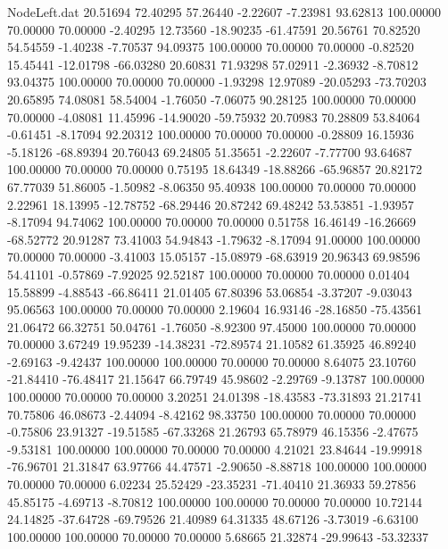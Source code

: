 \begin{filecontents}{NodeLeft.dat}
  20.51694   72.40295   57.26440    -2.22607   -7.23981   93.62813  100.00000   70.00000   70.00000   -2.40295   12.73560  -18.90235  -61.47591
  20.56761   70.82520   54.54559    -1.40238   -7.70537   94.09375  100.00000   70.00000   70.00000   -0.82520   15.45441  -12.01798  -66.03280
  20.60831   71.93298   57.02911    -2.36932   -8.70812   93.04375  100.00000   70.00000   70.00000   -1.93298   12.97089  -20.05293  -73.70203
  20.65895   74.08081   58.54004    -1.76050   -7.06075   90.28125  100.00000   70.00000   70.00000   -4.08081   11.45996  -14.90020  -59.75932
  20.70983   70.28809   53.84064    -0.61451   -8.17094   92.20312  100.00000   70.00000   70.00000   -0.28809   16.15936   -5.18126  -68.89394
  20.76043   69.24805   51.35651    -2.22607   -7.77700   93.64687  100.00000   70.00000   70.00000    0.75195   18.64349  -18.88266  -65.96857
  20.82172   67.77039   51.86005    -1.50982   -8.06350   95.40938  100.00000   70.00000   70.00000    2.22961   18.13995  -12.78752  -68.29446
  20.87242   69.48242   53.53851    -1.93957   -8.17094   94.74062  100.00000   70.00000   70.00000    0.51758   16.46149  -16.26669  -68.52772
  20.91287   73.41003   54.94843    -1.79632   -8.17094   91.00000  100.00000   70.00000   70.00000   -3.41003   15.05157  -15.08979  -68.63919
  20.96343   69.98596   54.41101    -0.57869   -7.92025   92.52187  100.00000   70.00000   70.00000    0.01404   15.58899   -4.88543  -66.86411
  21.01405   67.80396   53.06854    -3.37207   -9.03043   95.06563  100.00000   70.00000   70.00000    2.19604   16.93146  -28.16850  -75.43561
  21.06472   66.32751   50.04761    -1.76050   -8.92300   97.45000  100.00000   70.00000   70.00000    3.67249   19.95239  -14.38231  -72.89574
  21.10582   61.35925   46.89240    -2.69163   -9.42437  100.00000  100.00000   70.00000   70.00000    8.64075   23.10760  -21.84410  -76.48417
  21.15647   66.79749   45.98602    -2.29769   -9.13787  100.00000  100.00000   70.00000   70.00000    3.20251   24.01398  -18.43583  -73.31893
  21.21741   70.75806   46.08673    -2.44094   -8.42162   98.33750  100.00000   70.00000   70.00000   -0.75806   23.91327  -19.51585  -67.33268
  21.26793   65.78979   46.15356    -2.47675   -9.53181  100.00000  100.00000   70.00000   70.00000    4.21021   23.84644  -19.99918  -76.96701
  21.31847   63.97766   44.47571    -2.90650   -8.88718  100.00000  100.00000   70.00000   70.00000    6.02234   25.52429  -23.35231  -71.40410
  21.36933   59.27856   45.85175    -4.69713   -8.70812  100.00000  100.00000   70.00000   70.00000   10.72144   24.14825  -37.64728  -69.79526
  21.40989   64.31335   48.67126    -3.73019   -6.63100  100.00000  100.00000   70.00000   70.00000    5.68665   21.32874  -29.99643  -53.32337

\end{filecontents}
